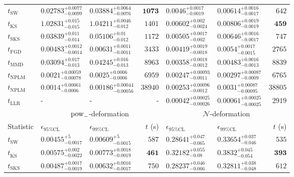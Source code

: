 \begin{tabular}{l|llr|llr}
	\midrule
	$t_{\mathrm{SW}}$ & $0.02783_{-0.0099}^{+0.0077}$ & $0.03884_{-0.0076}^{+0.0064}$ & ${\mathbf{1073}}$ & $0.0046_{-0.0019}^{+0.0017}$ & $0.00614_{-0.0017}^{+0.0016}$ & $642$ \\
	$t_{\overline{\mathrm{KS}}}$ & $1.02831_{-0.015}^{+0.015}$ & $1.04211_{-0.012}^{+0.0046}$ & $1401$ & $0.00602_{-0.0024}^{+0.002}$ & $0.00806_{-0.0019}^{+0.0019}$ & ${\mathbf{459}}$ \\
	$t_{\mathrm{SKS}}$ & $0.03839_{-0.014}^{+0.011}$ & $0.05106_{-0.012}^{+0.01}$ & $1172$ & $0.00505_{-0.002}^{+0.0017}$ & $0.00646_{-0.0017}^{+0.0016}$ & $747$ \\
	$t_{\mathrm{FGD}}$ & ${\mathbf{0.00483_{-0.0014}^{+0.0012}}}$ & ${\mathbf{0.00631_{-0.0011}^{+0.0011}}}$ & $3433$ & $0.00419_{-0.0018}^{+0.0019}$ & $0.0054_{-0.0015}^{+0.0017}$ & $2765$ \\
	$t_{\mathrm{MMD}}$ & $0.03094_{-0.013}^{+0.017}$ & $0.04245_{-0.013}^{+0.016}$ & $8963$ & ${\mathbf{0.00358_{-0.0012}^{+0.0018}}}$ & ${\mathbf{0.00483_{-0.0013}^{+0.0016}}}$ & $8839$ \\
\rowcolor{red!35}	$t_{\mathrm{NPLM}}$ & $0.0021_{-0.00078}^{+0.00059}$ & $0.0025_{-0.0006}^{+0.0006}$ & $6959$ & $0.00247_{-0.0011}^{+0.00093}$ & $0.00297_{-0.0009}^{+0.00087}$ & $6765$ \\
\rowcolor{blue!35}	$t_{\mathrm{NPLM}}$ & $0.0014_{-0.0006}^{+0.00061}$ & $0.00186_{-0.00056}^{+0.00044}$ & $38940$ & $0.00253_{-0.0012}^{+0.00096}$ & $0.0031_{-0.00095}^{+0.00087}$ & $38805$ \\
	$t_{\mathrm{LLR}}$ & - & - & - & $0.00042_{-0.00026}^{+0.00025}$ & $0.00061_{-0.00025}^{+0.00025}$ & $2919$ \\
	\toprule
	\multicolumn{1}{c}{} & \multicolumn{3}{c}{$\rm{pow}_{-}$-deformation} & \multicolumn{3}{c}{$\mathcal{N}$-deformation} \\
	Statistic & $\epsilon_{95\%\mathrm{CL}}$ & $\epsilon_{99\%\mathrm{CL}}$ & $t$ (s) & $\epsilon_{95\%\mathrm{CL}}$ & $\epsilon_{99\%\mathrm{CL}}$ & $t$ (s) \\
	\midrule
	$t_{\mathrm{SW}}$ & $0.00455_{-0.0017}^{+5}$ & $0.00609_{-0.0015}^{+5}$ & $587$ & $0.28641_{-0.065}^{+0.047}$ & $0.33654_{-0.046}^{+0.037}$ & $535$ \\
	$t_{\overline{\mathrm{KS}}}$ & $0.00575_{-0.0022}^{+0.002}$ & $0.00773_{-0.0019}^{+0.0018}$ & ${\mathbf{461}}$ & $0.32182_{-0.08}^{+0.055}$ & $0.3832_{-0.054}^{+0.045}$ & ${\mathbf{393}}$ \\
	$t_{\mathrm{SKS}}$ & $0.00487_{-0.0019}^{+0.0017}$ & $0.00632_{-0.0017}^{+0.0016}$ & $750$ & $0.28237_{-0.066}^{+0.046}$ & $0.32811_{-0.048}^{+0.038}$ & $612$ \\

\end{tabular}

